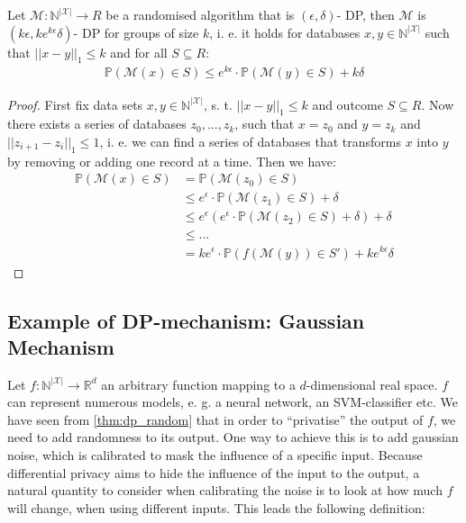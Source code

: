 \begin{thm}
    Let $\mathcal{M}: \mathbb{N}^{|\mathcal{X}|} \rightarrow R$ be a randomised algorithm that is $(\epsilon, \delta)$- DP, then $\mathcal{M}$ is $(k\epsilon, k e^{k\epsilon} \delta)$- DP for groups of size $k$, i. e. it holds for databases $x,y \in \mathbb{N}^{|\mathcal{X}|}$ such that $||x-y||_1\le k$ and for all $S \subseteq R$:
    \begin{align}
        \mathbb{P}(\mathcal{M}(x) \in S) \le e^{k\epsilon} \cdot \mathbb{P}(\mathcal{M}(y) \in S) + k\delta 
    \end{align}
\end{thm}
\begin{proof}
    First fix data sets $x,y \in \mathbb{N}^{|\mathcal{X}|}$, s. t. $||x-y||_1\le k$ and outcome $S \subseteq R$. Now there exists a series of databases $z_0,..., z_k$, such that $x=z_0$ and $y=z_k$ and $|| z_{i+1} - z_i||_1 \le 1$, i. e. we can find a series of databases that transforms $x$ into $y$ by removing or adding one record at a time. Then we have:
    \begin{align}
        \mathbb{P}(\mathcal{M}(x)\in S) &= \mathbb{P}(\mathcal{M}(z_0)\in S) \nonumber \\
        &\le e^\epsilon \cdot \mathbb{P}(\mathcal{M}(z_1)\in S) + \delta \nonumber \\
        &\le e^\epsilon \left( e^\epsilon \cdot \mathbb{P}(\mathcal{M}(z_2)\in S) + \delta \right) + \delta \nonumber \\
        &\le ... \nonumber \\
        &= k e^\epsilon \cdot \mathbb{P}(f(\mathcal{M}(y))\in S') + k e^{k \epsilon} \delta
    \end{align}
\end{proof}



\subsection{Example of DP-mechanism: Gaussian Mechanism}

Let $f:\mathbb{N}^{|\mathcal{X}|} \longrightarrow \mathbb{R}^d$ an arbitrary function mapping to a $d$-dimensional real space. $f$ can represent numerous models, e. g. a neural network, an SVM-classifier etc. We have seen from \cref{thm:dp_random} that in order to ``privatise'' the output of $f$, we need to add randomness to its output. One way to achieve this is to add gaussian noise, which is calibrated to mask the influence of a specific input. Because differential privacy aims to hide the influence of the input to the output, a natural quantity to consider when calibrating the noise is to look at how much $f$ will change, when using different inputs. This leads the following definition:

